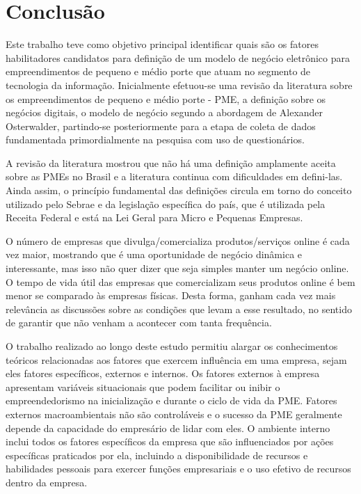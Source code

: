 \chapter{Conclusão}
\label{cap:conclusion}

Este trabalho teve como objetivo principal identificar quais são os fatores habilitadores candidatos para definição de um modelo de negócio eletrônico para empreendimentos de pequeno e médio porte que atuam no segmento de tecnologia da informação. Inicialmente efetuou-se uma revisão da literatura sobre os empreendimentos de pequeno e médio porte - PME, a definição sobre os negócios digitais, o modelo de negócio segundo a abordagem de Alexander Osterwalder,  partindo-se posteriormente para a etapa de coleta de dados fundamentada primordialmente na pesquisa com uso de questionários. 

A revisão da literatura mostrou que não há uma definição amplamente aceita sobre as PMEs no Brasil e a literatura continua com dificuldades em defini-las. Ainda assim, o princípio fundamental das definições circula em torno do conceito utilizado pelo Sebrae e da legislação específica do país, que é utilizada pela Receita Federal e está na Lei Geral para Micro e Pequenas Empresas. 

O número de empresas que divulga/comercializa produtos/serviços online é cada vez maior, mostrando que é uma oportunidade de negócio dinâmica e interessante, mas isso não quer dizer que seja simples manter um negócio online. O tempo de vida útil das empresas que comercializam seus produtos online é bem menor se comparado às empresas físicas. Desta forma, ganham cada vez mais relevância as discussões sobre as condições que levam a esse resultado, no sentido de garantir que não venham a acontecer com tanta frequência. 

O trabalho realizado ao longo deste estudo permitiu alargar os conhecimentos teóricos relacionadas aos fatores que exercem influência em uma empresa, sejam eles fatores específicos, externos e internos. Os fatores externos à empresa apresentam variáveis situacionais que podem facilitar ou inibir o empreendedorismo na inicialização e durante o ciclo de vida da PME. Fatores externos macroambientais não são controláveis e o sucesso da PME geralmente depende da capacidade do empresário de lidar com eles. O ambiente interno inclui todos os fatores específicos da empresa que são influenciados por ações específicas praticados por ela, incluindo a disponibilidade de recursos e habilidades pessoais para exercer funções empresariais e o uso efetivo de recursos dentro da empresa.

